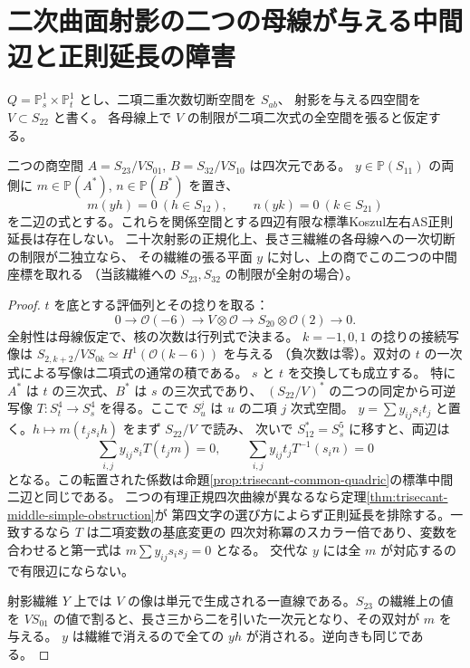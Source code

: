 \section{二次曲面射影の二つの母線が与える中間辺と正則延長の障害}
\label{sec:quadric-biform-window}
$Q=\mathbb P^1_s\times\mathbb P^1_t$ とし、二項二重次数切断空間を $S_{ab}$、
射影を与える四空間を $V\subset S_{22}$ と書く。
各母線上で $V$ の制限が二項二次式の全空間を張ると仮定する。
\begin{theorem}\label{thm:quadric-ruling-edge-obstruction}
二つの商空間 $A=S_{23}/V S_{01}$, $B=S_{32}/V S_{10}$ は四次元である。
$y\in\mathbb P(S_{11})$ の両側に $m\in\mathbb P(A^*)$, $n\in\mathbb P(B^*)$ を置き、
\[
            m(yh)=0\ (h\in S_{12}),\qquad n(yk)=0\ (k\in S_{21})
\]
を二辺の式とする。これらを関係空間とする四辺有限な標準Koszul左右AS正則延長は存在しない。
二十次射影の正規化上、長さ三繊維の各母線への一次切断の制限が二独立なら、
その繊維の張る平面 $y$ に対し、上の商でこの二つの中間座標を取れる
（当該繊維への $S_{23},S_{32}$ の制限が全射の場合）。
\end{theorem}
\begin{proof}
$t$ を底とする評価列とその捻りを取る：
\[
 0\longrightarrow\mathcal O(-6)\longrightarrow V\otimes\mathcal O
       \longrightarrow S_{20}\otimes\mathcal O(2)\longrightarrow0 .
\]
全射性は母線仮定で、核の次数は行列式で決まる。
$k=-1,0,1$ の捻りの接続写像は $S_{2,k+2}/V S_{0k}\simeq H^1(\mathcal O(k-6))$ を与える
（負次数は零）。双対の $t$ の一次式による写像は二項式の通常の積である。
$s$ と $t$ を交換しても成立する。
特に $A^*$ は $t$ の三次式、$B^*$ は $s$ の三次式であり、
$(S_{22}/V)^*$ の二つの同定から可逆写像 $T:S_t^4\to S_s^4$ を得る。ここで $S_u^j$ は $u$ の二項 $j$ 次式空間。
$y=\sum y_{ij}s_it_j$ と置く。$h\mapsto m(t_j s_i h)$ をまず $S_{22}/V$ で読み、
次いで $S_{12}^*=S_s^5$ に移すと、両辺は
\[
          \sum_{i,j} y_{ij}s_i T(t_jm)=0,\qquad
          \sum_{i,j} y_{ij}t_j T^{-1}(s_i n)=0
\]
となる。この転置された係数は命題\ref{prop:trisecant-common-quadric}の標準中間二辺と同じである。
二つの有理正規四次曲線が異なるなら定理\ref{thm:trisecant-middle-simple-obstruction}が
第四文字の選び方によらず正則延長を排除する。一致するなら $T$ は二項変数の基底変更の
四次対称冪のスカラー倍であり、変数を合わせると第一式は $m\sum y_{ij}s_i s_j=0$ となる。
交代な $y$ には全 $m$ が対応するので有限辺にならない。

射影繊維 $Y$ 上では $V$ の像は単元で生成される一直線である。$S_{23}$ の繊維上の値を
$V S_{01}$ の値で割ると、長さ三から二を引いた一次元となり、その双対が $m$ を与える。
$y$ は繊維で消えるので全ての $yh$ が消される。逆向きも同じである。
\end{proof}


